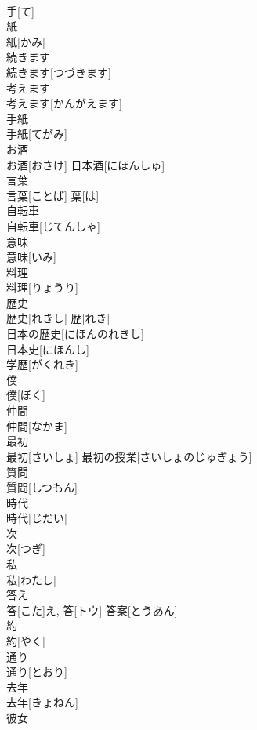 \documentclass[8pt]{extreport}
\begin{document}
\begin{CJK}{UTF8}{min}
\\	手[て]	
\\	紙	
\\	紙[かみ]	
\\	続きます	
\\	続きます[つづきます]	
\\	考えます	
\\	考えます[かんがえます]	
\\	手紙	
\\	手紙[てがみ]	
\\	お酒	
\\	お酒[おさけ]	日本酒[にほんしゅ] 
\\	言葉	
\\	言葉[ことば]	葉[は] 
\\	自転車	
\\	自転車[じてんしゃ]	
\\	意味	
\\	意味[いみ]	
\\	料理	
\\	料理[りょうり]	
\\	歴史	
\\	歴史[れきし]	歴[れき] 
\\	日本の歴史[にほんのれきし] 
\\	日本史[にほんし] 
\\	学歴[がくれき] 
\\	僕	
\\	僕[ぼく]	
\\	仲間	
\\	仲間[なかま]	
\\	最初	
\\	最初[さいしょ]	最初の授業[さいしょのじゅぎょう] 
\\	質問	
\\	質問[しつもん]	
\\	時代	
\\	時代[じだい]	
\\	次	
\\	次[つぎ]	
\\	私	
\\	私[わたし]	
\\	答え	
\\	答[こた]え, 答[トウ]	答案[とうあん] 
\\	約	
\\	約[やく]	
\\	通り	
\\	通り[とおり]	
\\	去年	
\\	去年[きょねん]	
\\	彼女	

\end{CJK}
\end{document}
